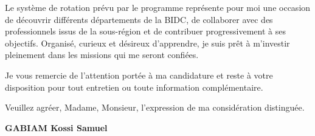 \documentclass[11pt,a4paper]{article}
\begin{document}
Le système de rotation prévu par le programme représente pour moi une
occasion de découvrir différents départements de la BIDC, de collaborer
avec des professionnels issus de la sous-région et de contribuer
progressivement à ses objectifs. Organisé, curieux et désireux d'apprendre,
je suis prêt à m'investir pleinement dans les missions qui me seront
confiées.

Je vous remercie de l'attention portée à ma candidature et reste à votre
disposition pour tout entretien ou toute information complémentaire.

Veuillez agréer, Madame, Monsieur, l'expression de ma considération
distinguée.

\vspace{0.3cm}

\textbf{GABIAM Kossi Samuel}
\end{document}
